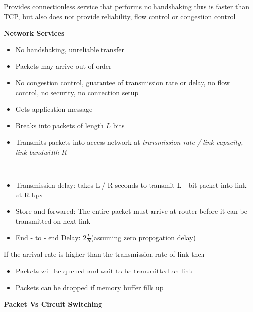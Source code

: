 \documentclass[12pt] {report}
\begin{document}
{
    Provides connectionless service that performs no handshaking thus is faster than TCP, but also does not provide reliability, flow control or congestion control

    \textbf{Network Services}
    \begin{itemize}
    \item No handshaking, unreliable transfer
    \item Packets may arrive out of order
    \item No congestion control, guarantee of transmission rate or delay, no flow control, no security, no connection setup
    \end{itemize}
}
{
    \begin{itemize}
    \item Gets application message
    \item Breaks into packets of length $L$ bits
    \item Transmits packets into access network at \textit{transmission rate / link capacity, link bandwidth} $R$
    \end{itemize}
    \begin{align* }
     =  = 
    \end{align* }
}
{
    \begin{itemize}
\item Transmission delay:
    takes L / R seconds to transmit L - bit packet into link at R bps
\item Store and forwared:
    The entire packet must arrive at router before it can be transmitted on next link
\item End - to - end Delay:
    $2\frac{L}{R}$(assuming zero propogation delay)
    \end{itemize}
    If the arrival rate is higher than the transmission rate of link then
    \begin{itemize}
    \item Packets will be queued and wait to be transmitted on link

    \item Packets can be dropped if memory buffer fills up
    \end{itemize}
}
\textbf{Packet Vs Circuit Switching}
\end{document}
